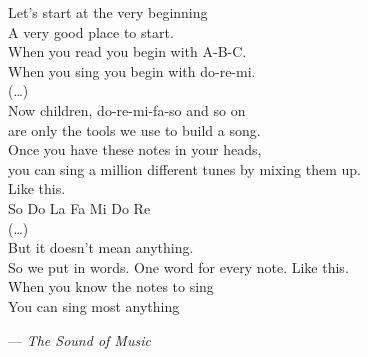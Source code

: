 \thispagestyle{empty}
\newlength{\quotewidth}
\null
\vfill
\settowidth{}
\begin{center}
  \parbox{\quotewidth}{
    Let's start at the very beginning \\
    A very good place to start. \\
    When you read you begin with A-B-C. \\
    When you sing you begin with do-re-mi. \\
    (\dots) \\
    Now children, do-re-mi-fa-so and so on \\
    are only the tools we use to build a song. \\
    Once you have these notes in your heads, \\
    you can sing a million different tunes by mixing them up. \\
    Like this. \\
    So Do La Fa Mi Do Re \\
    (\dots) \\
    But it doesn't mean anything. \\
    So we put in words. One word for every note. Like this. \\
    When you know the notes to sing \\
    You can sing most anything
    \par\bigskip
    \hfill --- \textit{The Sound of Music}
  }
\end{center}
\vfill
